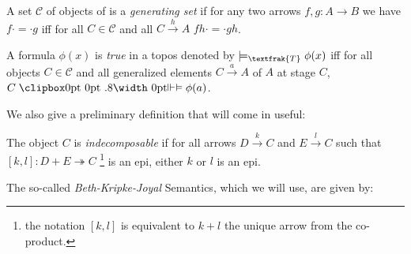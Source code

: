 \begin{definition}
	A set $\mathcal{C}$ of objects of  is a \emph{generating set} if for any two arrows $f,g :A \rightarrow B$ we have $f \cdot = \cdot g$ iff for all $C\in \mathcal{C}$ and all $C \xrightarrow{h} A$
	$fh \cdot = \cdot gh$.
\end{definition} 

\begin{definition}
	A formula $\phi(x)$ is \emph{true} in a topos  denoted by $\models_{\textfrak{T}} \phi(x)$ iff for all objects $C \in \mathcal{C}$ and all generalized elements $C \xrightarrow{a} A$ of $A$ at stage $C$, $C \VDashA \phi(a)$. 
\end{definition}

We also give a preliminary definition that will come in useful:

\begin{definition}[indecomposable]
	The object $C$ is \emph{indecomposable} if for all arrows $D \xrightarrow{k} C$ and $E \xrightarrow{l} C$ such that $[k,l]: D+E \twoheadrightarrow C$ \footnote{the notation $[k,l]$ is equivalent to $k+l$ the unique arrow from the co-product.} is an epi, either $k$ or $l$ is an epi.
\end{definition} 

The so-called \emph{Beth-Kripke-Joyal} Semantics, which we will use, are given by:

